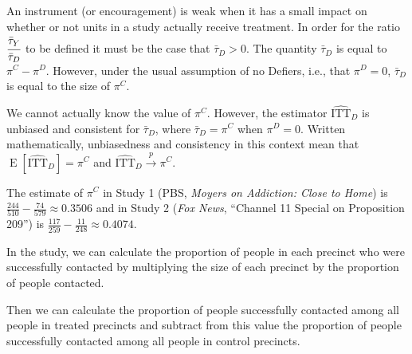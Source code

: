 \documentclass[
  12pt,
  leqno]{article}
\newenvironment{Shaded}{\begin{snugshade}}{\end{snugshade}}
\newcommand{\KeywordTok}[1]{\textcolor[rgb]{0.13,0.29,0.53}{\textbf{#1}}}
\newcommand{\NormalTok}[1]{#1}
\newcommand{\OperatorTok}[1]{\textcolor[rgb]{0.81,0.36,0.00}{\textbf{#1}}}
\newcommand{\StringTok}[1]{\textcolor[rgb]{0.31,0.60,0.02}{#1}}
\DeclareMathOperator{\E}{\mathrm{E}}
\DeclareMathOperator{\1}{\mathbbm{1}}
\begin{document}
An instrument (or encouragement) is weak when it has a small impact on
whether or not units in a study actually receive treatment. In order for
the ratio \(\cfrac{\bar{\tau}_Y}{\bar{\tau}_D}\) to be defined it must
be the case that \(\bar{\tau}_D > 0\). The quantity \(\bar{\tau}_D\) is
equal to \(\pi^C - \pi^D\). However, under the usual assumption of no
Defiers, i.e., that \(\pi^D = 0\), \(\bar{\tau}_D\) is equal to the size
of \(\pi^C\).

We cannot actually know the value of \(\pi^C\). However, the estimator
\(\widehat{\text{ITT}}_D\) is unbiased and consistent for
\(\bar{\tau}_D\), where \(\bar{\tau}_D = \pi^C\) when \(\pi^D = 0\).
Written mathematically, unbiasedness and consistency in this context
mean that \(\E\left[\widehat{\text{ITT}}_D\right] = \pi^C\) and
\(\widehat{\text{ITT}}_D \overset{p}{\to} \pi^C\).

The estimate of \(\pi^C\) in Study 1 (PBS,
\textit{Moyers on Addiction: Close to Home}) is
\(\frac{244}{510} - \frac{74}{579} \approx 0.3506\) and in Study 2
(\textit{Fox News}, ``Channel 11 Special on Proposition 209'') is
\(\frac{117}{259} - \frac{11}{248} \approx 0.4074\).

In the \citet{arceneaux2005} study, we can calculate the proportion of
people in each precinct who were successfully contacted by multiplying
the size of each precinct by the proportion of people contacted.

\scriptsize

\begin{Shaded}
\end{Shaded}

\normalsize

Then we can calculate the proportion of people successfully contacted
among all people in treated precincts and subtract from this value the
proportion of people successfully contacted among all people in control
precincts.

\scriptsize
\end{document}
